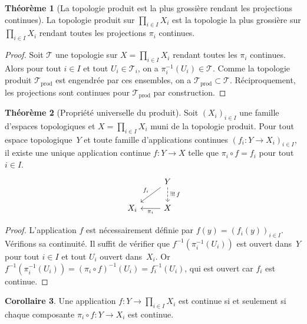 \documentclass[12pt,a4paper,openany]{book}
\theoremstyle{definition}
\theoremstyle{cours}
\newtheorem{theoreme}{Théorème}[chapter]
\newtheorem{corollaire}[theoreme]{Corollaire}
\theoremstyle{coursnormal}
\begin{document}
\begin{theoreme}[La topologie produit est la plus grossière rendant les projections continues]
\label{thm:produit-plus-grossiere}
La topologie produit sur $\prod_{i \in I} X_i$ est la topologie la plus grossière
sur $\prod_{i \in I} X_i$ rendant toutes les projections $\pi_i$ continues.
\end{theoreme}

\begin{proof}
Soit $\mathcal{T}$ une topologie sur $X = \prod_{i \in I} X_i$ rendant toutes les
$\pi_i$ continues. Alors pour tout $i \in I$ et tout $U_i \in \mathcal{T}_i$, on a
$\pi_i^{-1}(U_i) \in \mathcal{T}$. Comme la topologie produit $\mathcal{T}_{\mathrm{prod}}$
est engendrée par ces ensembles, on a $\mathcal{T}_{\mathrm{prod}} \subset \mathcal{T}$.
Réciproquement, les projections sont continues pour $\mathcal{T}_{\mathrm{prod}}$
par construction.
\end{proof}

\begin{theoreme}[Propriété universelle du produit]
\label{thm:universelle-produit}
Soit $(X_i)_{i \in I}$ une famille d'espaces topologiques et $X = \prod_{i \in I} X_i$
muni de la topologie produit. Pour tout espace topologique~$Y$ et toute famille
d'applications continues $(f_i \colon Y \to X_i)_{i \in I}$, il existe une unique
application continue $f \colon Y \to X$ telle que $\pi_i \circ f = f_i$ pour tout
$i \in I$.
\[
\begin{tikzcd}
  & Y \arrow[dl, "f_i"'] \arrow[d, dashed, "\exists!\, f"] \\
  X_i & X \arrow[l, "\pi_i"]
\end{tikzcd}
\]
\end{theoreme}

\begin{proof}
L'application $f$ est nécessairement définie par $f(y) = (f_i(y))_{i \in I}$.
Vérifions sa continuité. Il suffit de vérifier que $f^{-1}(\pi_i^{-1}(U_i))$
est ouvert dans~$Y$ pour tout $i \in I$ et tout $U_i$ ouvert dans~$X_i$. Or
$f^{-1}(\pi_i^{-1}(U_i)) = (\pi_i \circ f)^{-1}(U_i) = f_i^{-1}(U_i)$,
qui est ouvert car $f_i$ est continue.
\end{proof}

\begin{corollaire}
\label{cor:continuite-produit}
Une application $f \colon Y \to \prod_{i \in I} X_i$ est continue si et seulement
si chaque composante $\pi_i \circ f \colon Y \to X_i$ est continue.
\end{corollaire}
\end{document}
